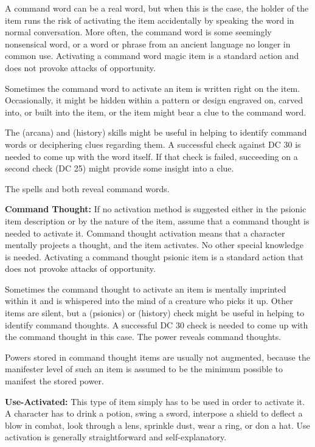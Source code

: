 A command word can be a real word, but when this is the case, the holder of the item runs the risk of activating the item accidentally by speaking the word in normal conversation. More often, the command word is some seemingly nonsensical word, or a word or phrase from an ancient language no longer in common use. Activating a command word magic item is a standard action and does not provoke attacks of opportunity. 

Sometimes the command word to activate an item is written right on the item. Occasionally, it might be hidden within a pattern or design engraved on, carved into, or built into the item, or the item might bear a clue to the command word.

The  (arcana) and  (history) skills might be useful in helping to identify command words or deciphering clues regarding them. A successful check against DC 30 is needed to come up with the word itself. If that check is failed, succeeding on a second check (DC 25) might provide some insight into a clue.

The spells  and  both reveal command words.

\textbf{Command Thought:} If no activation method is suggested either in the psionic item description or by the nature of the item, assume that a command thought is needed to activate it. Command thought activation means that a character mentally projects a thought, and the item activates. No other special knowledge is needed. Activating a command thought psionic item is a standard action that does not provoke attacks of opportunity.

Sometimes the command thought to activate an item is mentally imprinted within it and is whispered into the mind of a creature who picks it up. Other items are silent, but a  (psionics) or  (history) check might be useful in helping to identify command thoughts. A successful DC 30 check is needed to come up with the command thought in this case. The power  reveals command thoughts.

Powers stored in command thought items are usually not augmented, because the manifester level of such an item is assumed to be the minimum possible to manifest the stored power.

\textbf{Use-Activated:} This type of item simply has to be used in order to activate it. A character has to drink a potion, swing a sword, interpose a shield to deflect a blow in combat, look through a lens, sprinkle dust, wear a ring, or don a hat. Use activation is generally straightforward and self-explanatory.

